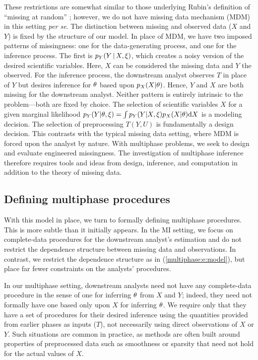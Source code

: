 These restrictions are somewhat similar to those underlying Rubin's definition of ``missing at random'' \citeyearpar{Rubin1976}; however, we do not have missing data mechanism (MDM) in this setting \emph{per se}.
The distinction between missing and observed data ($X$ and $Y$) is fixed by the structure of our model.
In place of MDM, we have two imposed patterns of missingness: one for the data-generating process, and one for the inference process.
The first is $p_Y(Y \, | \, X, \xi)$, which creates a noisy version of the desired scientific variables.
Here, $X$ can be considered the missing data and $Y$ the observed.
For the inference process, the downstream analyst observes $T$ in place of $Y$ but desires inference for $\theta$ based upon $p_X(X | \theta)$.
Hence, $Y$ and $X$ are both missing for the downstream analyst.
Neither pattern is entirely intrinsic to the problem---both are fixed by choice.
The selection of scientific variables $X$ for a given marginal likelihood $p_Y(Y | \theta, \xi) = \int p_Y(Y | X, \xi) p_X(X | \theta) \mathrm{d} X$ is a modeling decision.
The selection of preprocessing $T(Y, U)$ is fundamentally a design decision.
This contrasts with the typical missing data setting, where MDM is forced upon the analyst by nature.
With multiphase problems, we seek to design and evaluate engineered missingness.
The investigation of multiphase inference therefore requires tools and ideas from design, inference, and computation in addition to the theory of missing data.

\subsection{Defining multiphase procedures}
\label{multiphase:sec:def}

With this model in place, we turn to formally defining multiphase procedures.
This is more subtle than it initially appears.
In the MI setting, we focus on complete-data procedures for the downstream analyst's estimation and do not restrict the dependence structure between missing data and observations.
In contrast, we restrict the dependence structure as in (\ref{multiphase:e:model}), but place far fewer constraints on the analysts' procedures.

In our multiphase setting, downstream analysts need not have any complete-data procedure in the sense of one for inferring $\theta$ from $X$ and $Y$; indeed, they need not formally have one based only upon $X$ for inferring $\theta$.
We require only that they have a set of procedures for their desired inference using the quantities provided from earlier phases as inputs ($T$),  not necessarily  using direct observations of $X$ or $Y$.
Such situations are common in practice, as methods are often built around properties of preprocessed data such as smoothness or sparsity that need not hold for the actual values of $X$.

